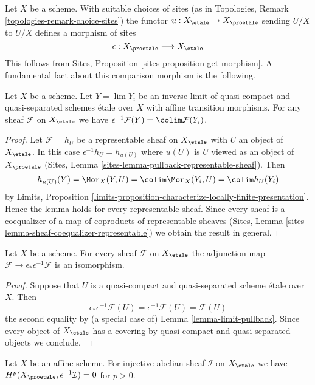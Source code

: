 \noindent
Let $X$ be a scheme. With suitable choices of sites (as in
Topologies, Remark \ref{topologies-remark-choice-sites})
the functor $u : X_\etale \to X_\proetale$ sending
$U/X$ to $U/X$ defines a morphism of sites
$$
\epsilon : X_\proetale \longrightarrow X_\etale
$$
This follows from Sites, Proposition \ref{sites-proposition-get-morphism}.
A fundamental fact about this comparison morphism is the following.

\begin{lemma}
\label{lemma-limit-pullback}
Let $X$ be a scheme. Let $Y = \lim Y_i$ be an inverse limit
of quasi-compact and quasi-separated schemes \'etale over $X$
with affine transition morphisms. For any sheaf $\mathcal{F}$
on $X_\etale$ we have
$\epsilon^{-1}\mathcal{F}(Y) = \colim \mathcal{F}(Y_i)$.
\end{lemma}

\begin{proof}
Let $\mathcal{F} = h_U$ be a representable sheaf on $X_\etale$
with $U$ an object of $X_\etale$. In this case
$\epsilon^{-1}h_U = h_{u(U)}$ where $u(U)$ is $U$ viewed as an object of
$X_\proetale$ (Sites, Lemma \ref{sites-lemma-pullback-representable-sheaf}).
Then
$$
h_{u(U)}(Y) = \Mor_X(Y, U) = \colim \Mor_X(Y_i, U) = \colim h_U(Y_i)
$$
by Limits, Proposition
\ref{limits-proposition-characterize-locally-finite-presentation}.
Hence the lemma holds for every representable sheaf. Since every sheaf
is a coequalizer of a map of coproducts of representable sheaves
(Sites, Lemma \ref{sites-lemma-sheaf-coequalizer-representable})
we obtain the result in general.
\end{proof}

\begin{lemma}
\label{lemma-fully-faithful}
Let $X$ be a scheme. For every sheaf $\mathcal{F}$ on $X_\etale$
the adjunction map $\mathcal{F} \to \epsilon_*\epsilon^{-1}\mathcal{F}$ is an
isomorphism.
\end{lemma}

\begin{proof}
Suppose that $U$ is a quasi-compact and quasi-separated scheme \'etale
over $X$. Then
$$
\epsilon_*\epsilon^{-1}\mathcal{F}(U) =
\epsilon^{-1}\mathcal{F}(U) =
\mathcal{F}(U)
$$
the second equality by (a special case of) Lemma \ref{lemma-limit-pullback}.
Since every object of $X_\etale$
has a covering by quasi-compact and quasi-separated objects we conclude.
\end{proof}

\begin{lemma}
\label{lemma-affine-vanishing}
Let $X$ be an affine scheme. For injective abelian sheaf $\mathcal{I}$ on
$X_\etale$ we have $H^p(X_\proetale, \epsilon^{-1}\mathcal{I}) = 0$
for $p > 0$.
\end{lemma}

